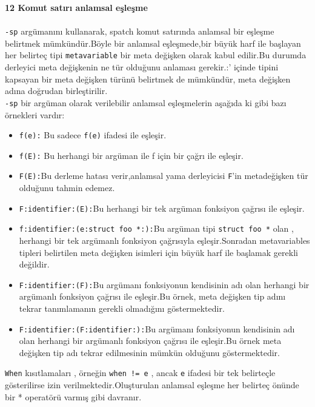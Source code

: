\documentclass[a4paper,22pt]{article}
\begin{document}
\textbf{12 Komut satırı anlamsal eşleşme}\\
\\
\texttt{-sp} argümanını kullanarak, spatch komut satırında anlamsal bir eşleşme belirtmek mümkündür.Böyle bir anlamsal eşleşmede,bir büyük harf ile başlayan her belirteç tipi \texttt{metavariable} bir meta değişken olarak kabul edilir.Bu durumda derleyici meta değişkenin ne tür olduğunu anlaması gerekir.:' içinde tipini kapsayan bir meta değişken türünü belirtmek de mümkündür, meta değişken adına doğrudan birleştirilir.
\\\texttt{-sp} bir argüman olarak verilebilir anlamsal eşleşmelerin aşağıda ki gibi bazı örnekleri vardır:
\flushleft
\begin{itemize}
\item \texttt{f(e):} Bu sadece \texttt{f(e)} ifadesi ile eşleşir.
\item \texttt{f(E):} Bu herhangi bir argüman ile f için bir çağrı ile eşleşir.
\item \texttt{F(E):}Bu derleme hatası verir,anlamsal yama derleyicisi \texttt{F}'in metadeğişken tür olduğunu tahmin edemez.
\item \texttt{F:identifier:(E):}Bu herhangi bir tek argüman fonksiyon çağrısı ile eşleşir.
\item  \texttt{f:identifier:(e:struct foo *:):}Bu argüman tipi \texttt{struct foo *} olan , herhangi bir tek argümanlı fonksiyon çağrısıyla eşleşir.Sonradan metavariables tipleri belirtilen meta değişken isimleri için büyük harf ile başlamak gerekli değildir.
\item \texttt{F:identifier:(F):}Bu argümanı fonksiyonun kendisinin adı olan herhangi bir argümanlı fonksiyon çağrısı ile eşleşir.Bu örnek, meta değişken tip adını tekrar tanımlamanın gerekli olmadığını göstermektedir.
\item \texttt{F:identifier:(F:identifier:):}Bu argümanı fonksiyonun kendisinin adı olan herhangi bir argümanlı fonksiyon çağrısı ile eşleşir.Bu örnek meta değişken tip adı tekrar edilmesinin mümkün olduğunu göstermektedir.
\end{itemize}
\flushleft
\texttt{When} kısıtlamaları , örneğin \texttt{when != e} , ancak \texttt{e} ifadesi bir tek belirteçle gösterilirse izin verilmektedir.Oluşturulan anlamsal eşleşme her belirteç önünde bir * operatörü varmış gibi davranır.
\end{document}
